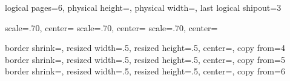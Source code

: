   {
    \edef\pgfpageoptionheight{\the\paperheight}
    \edef\pgfpageoptionwidth{\the\paperwidth}
    \edef\pgfpageoptionborder{0pt}
 }
 {
    \pgfpagesphysicalpageoptions
    {%
      logical pages=6,%
      physical height=\pgfpageoptionheight,%
      physical width=\pgfpageoptionwidth,%
      last logical shipout=3%
    }
    
        {%
                scale=.70,
                center=\pgfpoint{.25\pgfphysicalwidth}{.82\pgfphysicalheight}%
        }%
        {%
                scale=.70,
                center=\pgfpoint{.25\pgfphysicalwidth}{.50\pgfphysicalheight}%
        }%
        {%
                scale=.70,
                center=\pgfpoint{.25\pgfphysicalwidth}{.18\pgfphysicalheight}%
        }%

	
    {%
      border shrink=\pgfpageoptionborder,%
      resized width=.5\pgfphysicalwidth,%
      resized height=.5\pgfphysicalheight,%
      center=\pgfpoint{.75\pgfphysicalwidth}{.82\pgfphysicalheight},%
      copy from=4
    }%
    {%
      border shrink=\pgfpageoptionborder,%
      resized width=.5\pgfphysicalwidth,%
      resized height=.5\pgfphysicalheight,%
      center=\pgfpoint{.75\pgfphysicalwidth}{.50\pgfphysicalheight},%
      copy from=5
    }%
    {%
      border shrink=\pgfpageoptionborder,%
      resized width=.5\pgfphysicalwidth,%
      resized height=.5\pgfphysicalheight,%
      center=\pgfpoint{.75\pgfphysicalwidth}{.18\pgfphysicalheight},%
      copy from=6
    }%
    
 }





